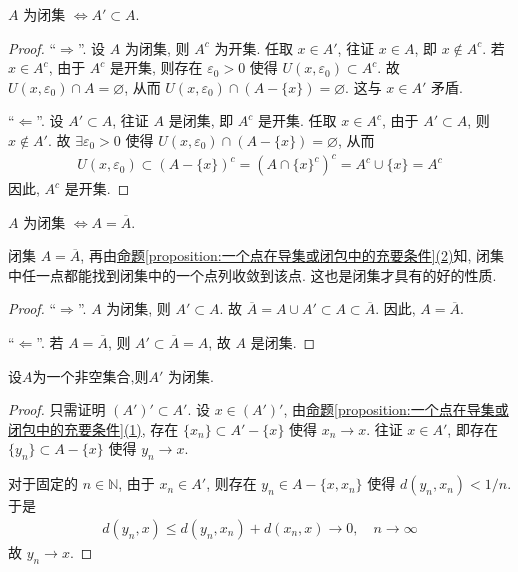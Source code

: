 \documentclass[../../main.tex]{subfiles}
\begin{document}
\begin{theorem}
$A$ 为闭集 $\Leftrightarrow A' \subset A$.
\end{theorem}
\begin{proof}
“$\Rightarrow$”. 设 $A$ 为闭集, 则 $A^c$ 为开集. 任取 $x \in A'$, 往证 $x \in A$, 即 $x \notin A^c$. 若 $x \in A^c$, 由于 $A^c$ 是开集, 则存在 $\varepsilon_0 > 0$ 使得 $U(x, \varepsilon_0) \subset A^c$. 故 $U(x, \varepsilon_0) \cap A = \varnothing$, 从而 $U(x, \varepsilon_0) \cap (A - \{x\}) = \varnothing$. 这与 $x \in A'$ 矛盾.

“$\Leftarrow$”. 设 $A' \subset A$, 往证 $A$ 是闭集, 即 $A^c$ 是开集. 任取 $x \in A^c$, 由于 $A' \subset A$, 则 $x \notin A'$. 故 $\exists \varepsilon_0 > 0$ 使得 $U(x, \varepsilon_0) \cap (A - \{x\}) = \varnothing$, 从而
\begin{align*}
U(x, \varepsilon_0) \subset (A - \{x\})^c = (A \cap \{x\}^c)^c = A^c \cup \{x\} = A^c
\end{align*}
因此, $A^c$ 是开集.
\end{proof}

\begin{theorem}
$A$ 为闭集 $\Leftrightarrow A = \overline{A}$.
\end{theorem}
\begin{remark}
闭集 $A = \overline{A}$, 再由\hyperref[proposition:一个点在导集或闭包中的充要条件]{命题\ref{proposition:一个点在导集或闭包中的充要条件}(2)}知, 闭集中任一点都能找到闭集中的一个点列收敛到该点. 这也是闭集才具有的好的性质.
\end{remark}
\begin{proof}
“$\Rightarrow$”. $A$ 为闭集, 则 $A' \subset A$. 故 $\overline{A} = A \cup A' \subset A \subset \overline{A}$. 因此, $A = \overline{A}$.

“$\Leftarrow$”. 若 $A = \overline{A}$, 则 $A' \subset \overline{A} = A$, 故 $A$ 是闭集.
\end{proof}

\begin{theorem}
设$A$为一个非空集合,则$A'$ 为闭集.
\end{theorem}
\begin{proof}
只需证明 $(A')' \subset A'$. 设 $x \in (A')'$, 由\hyperref[proposition:一个点在导集或闭包中的充要条件]{命题\ref{proposition:一个点在导集或闭包中的充要条件}(1)}, 存在 $\{x_n\} \subset A' - \{x\}$ 使得 $x_n \to x$. 往证 $x \in A'$, 即存在 $\{y_n\} \subset A - \{x\}$ 使得 $y_n \to x$.

对于固定的 $n \in \mathbb{N}$, 由于 $x_n \in A'$, 则存在 $y_n \in A - \{x, x_n\}$ 使得 $d(y_n, x_n) < 1/n$. 于是
\begin{align*}
d(y_n, x) \leqslant d(y_n, x_n) + d(x_n, x) \to 0, \quad n \to \infty
\end{align*}
故 $y_n \to x$.
\end{proof}
\end{document}
